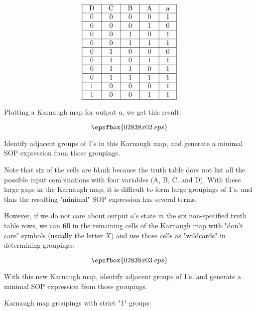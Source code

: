 
$$\vbox{\offinterlineskip
\halign{\strut
\vrule \quad\hfil # \ \hfil & 
\vrule \quad\hfil # \ \hfil & 
\vrule \quad\hfil # \ \hfil & 
\vrule \quad\hfil # \ \hfil & 
\vrule \quad\hfil # \ \hfil \vrule \cr
\noalign{\hrule}
%
D & C & B & A & a \cr
%
\noalign{\hrule}
%
0 & 0 & 0 & 0 & 1 \cr
%
\noalign{\hrule}
%
0 & 0 & 0 & 1 & 0 \cr
%
\noalign{\hrule}
%
0 & 0 & 1 & 0 & 1 \cr
%
\noalign{\hrule}
%
0 & 0 & 1 & 1 & 1 \cr
%
\noalign{\hrule}
%
0 & 1 & 0 & 0 & 0 \cr
%
\noalign{\hrule}
%
0 & 1 & 0 & 1 & 1 \cr
%
\noalign{\hrule}
%
0 & 1 & 1 & 0 & 1 \cr
%
\noalign{\hrule}
%
0 & 1 & 1 & 1 & 1 \cr
%
\noalign{\hrule}
%
1 & 0 & 0 & 0 & 1 \cr
%
\noalign{\hrule}
%
1 & 0 & 0 & 1 & 1 \cr
%
\noalign{\hrule}
} %
}$$ %

Plotting a Karnaugh map for output $a$, we get this result:

$$\epsfbox{02838x02.eps}$$

Identify adjacent groups of 1's in this Karnaugh map, and generate a minimal SOP expression from those groupings.

\vskip 10pt

Note that six of the cells are blank because the truth table does not list all the possible input combinations with four variables (A, B, C, and D).  With these large gaps in the Karnaugh map, it is difficult to form large groupings of 1's, and thus the resulting "minimal" SOP expression has several terms.  

However, if we do not care about output $a$'s state in the six non-specified truth table rows, we can fill in the remaining cells of the Karnaugh map with "don't care" symbols (usually the letter $X$) and use those cells as "wildcards" in determining groupings:

$$\epsfbox{02838x03.eps}$$

With this new Karnaugh map, identify adjacent groups of 1's, and generate a minimal SOP expression from those groupings.







Karnaugh map groupings with strict "1" groups:

